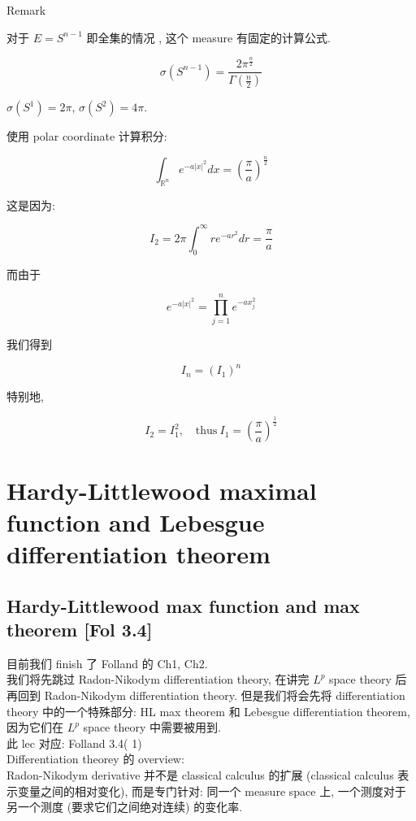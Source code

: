 \documentclass{qlnotes-export}
\begin{document}
\begin{qlremark}{Remark}

对于 \(E = S^{n - 1}\) 即全集的情况 , 这个 measure 有固定的计算公式.

\[\sigma(S^{n - 1}) = \frac{2\pi^{\frac{n}{2}}}{\Gamma(\frac{n}{2})}\]

\end{qlremark}

\begin{example}\label{ex-07-lebesgue-measure-on-r-n-example-002}

\(\sigma(S^{1}) = 2\pi\), \(\sigma(S^{2}) = 4\pi\).

\end{example}

\begin{example}\label{ex-07-lebesgue-measure-on-r-n-example-003}

使用 polar coordinate 计算积分:

\[\int_{{\mathbb{R}}^{n}}e^{- a|x|^{2}} dx = (\frac{\pi}{a})^{\frac{n}{2}}\]

这是因为:

\[I_{2} = 2\pi\int_{0}^{\infty}re^{- ar^{2}} dr = \frac{\pi}{a}\]

而由于

\[e^{- a|x|^{2}} = \prod\limits_{j = 1}^{n}e^{- ax_{j}^{2}}\]

我们得到

\[I_{n} = (I_{1})^{n}\]

特别地,

\[I_{2} = I_{1}^{2},\quad\text{thus}\ I_{1} = (\frac{\pi}{a})^{\frac{1}{2}}\]

\end{example}

\chapter{Hardy-Littlewood maximal function and Lebesgue differentiation theorem}\label{hardy-littlewood-maximal-function-and-lebesgue-differentiation-theorem}

\section{Hardy-Littlewood max function and max theorem {[}Fol 3.4{]}}

目前我们 finish 了 Folland 的 Ch1, Ch2.\\
我们将先跳过 Radon-Nikodym differentiation theory, 在讲完 \(L^{p}\) space theory 后再回到 Radon-Nikodym differentiation theory. 但是我们将会先将 differentiation theory 中的一个特殊部分: HL max theorem 和 Lebesgue differentiation theorem, 因为它们在 \(L^{p}\) space theory 中需要被用到.\\
此 lec 对应: Folland 3.4( 1)\\
Differentiation theorey 的 overview:\\
Radon-Nikodym derivative 并不是 classical calculus 的扩展 (classical calculus 表示变量之间的相对变化), 而是专门针对: 同一个 measure space 上, 一个测度对于另一个测度 (要求它们之间绝对连续) 的变化率.
\end{document}
